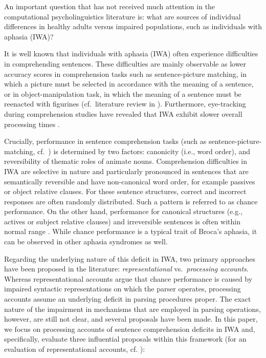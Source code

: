 \documentclass[10pt,letterpaper]{article}
\begin{document}
An important question that has not received much attention in the computational psycholinguistics literature is: what are sources of individual differences in healthy adults versus impaired populations, such as individuals with aphasia (IWA)? 


It is well known that individuals with aphasia (IWA) often experience difficulties in comprehending sentences. These difficulties are mainly observable as lower accuracy scores in comprehension tasks such as sentence-picture matching, in which a picture must be selected in accordance with the meaning of a sentence, or in object-manipulation task, in which the meaning of a sentence must be reenacted with figurines (cf.\ literature review in ). Furthermore, eye-tracking during comprehension studies have revealed that IWA exhibit slower overall processing times \cite{hanneetal11}.

Crucially, performance in sentence comprehension tasks (such as sentence-picture-matching, cf.\ ) is determined by two factors: canonicity (i.e., word order), and reversibility of thematic roles of animate nouns. Comprehension difficulties in IWA are selective in nature and particularly pronounced in sentences that are semantically reversible and have non-canonical word order, for example passives or object relative clauses. For these sentence structures, correct and incorrect responses are often randomly distributed. Such a pattern is referred to as chance performance. On the other hand, performance for canonical structures (e.g., actives or subject relative clauses) and irreversible sentences is often within normal range \cite{hanneetal11}. While chance performance is a typical trait of Broca's aphasia, it can be observed in other aphasia syndromes as well.

Regarding the underlying nature of this deficit in IWA, two primary approaches have been proposed in the literature: \emph{representational} vs.\ \emph{processing accounts}. Whereas representational accounts \cite{Grodzinsky1995} argue that chance performance is caused by impaired syntactic representations on which the parser operates, processing accounts assume an underlying deficit in parsing procedures proper. The exact nature of the impairment in mechanisms that are employed in parsing operations, however, are still not clear, and several proposals have been made. In this paper, we focus on processing accounts of sentence comprehension deficits in IWA and, specifically, evaluate three influential proposals within this framework (for an evaluation of representational accounts, cf. ):
\end{document}
